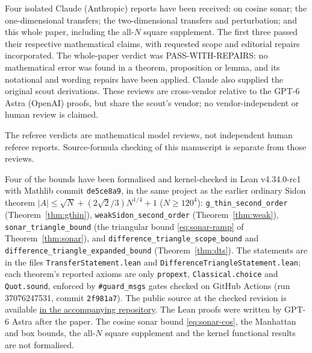 \documentclass[10pt]{article}
\numberwithin{equation}{section}
\theoremstyle{remark}
\newcommand{\RefereeStatus}{Four isolated Claude (Anthropic) reports have been received: on cosine sonar; the one-dimensional transfers; the two-dimensional transfers and perturbation; and this whole paper, including the all-$N$ square supplement. The first three passed their respective mathematical claims, with requested scope and editorial repairs incorporated. The whole-paper verdict was PASS-WITH-REPAIRS: no mathematical error was found in a theorem, proposition or lemma, and its notational and wording repairs have been applied. Claude also supplied the original scout derivations. These reviews are cross-vendor relative to the GPT-6 Astra (OpenAI) proofs, but share the scout's vendor; no vendor-independent or human review is claimed.}
\begin{document}
\RefereeStatus

The referee verdicts are mathematical model reviews, not independent
human referee reports. Source-formula checking of this manuscript is
separate from those reviews.

\begin{sloppypar}
Four of the bounds have been formalised and kernel-checked in Lean
v4.34.0-rc1 with Mathlib commit \texttt{de5ce8a9}, in the same project
as the earlier ordinary Sidon theorem
$|A|\le\sqrt N+(2\sqrt2/3)N^{1/4}+1$ ($N\ge120^4$):
\texttt{g\_thin\_second\_order} (Theorem~\ref{thm:gthin}),
\texttt{weakSidon\_second\_order} (Theorem~\ref{thm:weak}),
\texttt{sonar\_triangle\_bound} (the triangular bound
\eqref{eq:sonar-ramp} of Theorem~\ref{thm:sonar}), and
\texttt{difference\_triangle\_scope\_bound} and \texttt{difference\_\allowbreak triangle\_\allowbreak expanded\_\allowbreak bound} (Theorem~\ref{thm:dts}).
The statements are in the files \texttt{TransferStatement.lean} and
\texttt{DifferenceTriangle\allowbreak Statement.lean}; each theorem's reported
axioms are only \texttt{propext}, \texttt{Classical.choice} and
\texttt{Quot.sound}, enforced by \texttt{\#guard\_msgs} gates checked
on GitHub Actions (run 37076247531, commit \texttt{2f981a7}).
The public source at the checked revision is available
\href{https://github.com/chy4pro/automath/tree/2f981a7/lean/sidon30}{in the accompanying repository}.
The Lean proofs were written by GPT-6 Astra after the paper. The cosine
sonar bound \eqref{eq:sonar-cos}, the Manhattan and box bounds, the
all-$N$ square supplement and the kernel functional results are not
formalised.
\end{sloppypar}
\end{document}
